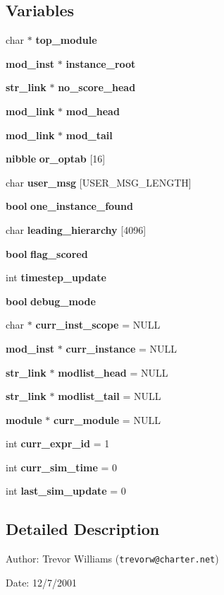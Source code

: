 \subsection*{Variables}
\begin{CompactItemize}
\item 
char $\ast$ {\bf top\_\-module}
\item 
{\bf mod\_\-inst} $\ast$ {\bf instance\_\-root}
\item 
{\bf str\_\-link} $\ast$ {\bf no\_\-score\_\-head}
\item 
{\bf mod\_\-link} $\ast$ {\bf mod\_\-head}
\item 
{\bf mod\_\-link} $\ast$ {\bf mod\_\-tail}
\item 
{\bf nibble} {\bf or\_\-optab} [16]
\item 
char {\bf user\_\-msg} [USER\_\-MSG\_\-LENGTH]
\item 
{\bf bool} {\bf one\_\-instance\_\-found}
\item 
char {\bf leading\_\-hierarchy} [4096]
\item 
{\bf bool} {\bf flag\_\-scored}
\item 
int {\bf timestep\_\-update}
\item 
{\bf bool} {\bf debug\_\-mode}
\item 
char $\ast$ {\bf curr\_\-inst\_\-scope} = NULL
\item 
{\bf mod\_\-inst} $\ast$ {\bf curr\_\-instance} = NULL
\item 
{\bf str\_\-link} $\ast$ {\bf modlist\_\-head} = NULL
\item 
{\bf str\_\-link} $\ast$ {\bf modlist\_\-tail} = NULL
\item 
{\bf module} $\ast$ {\bf curr\_\-module} = NULL
\item 
int {\bf curr\_\-expr\_\-id} = 1
\item 
int {\bf curr\_\-sim\_\-time} = 0
\item 
int {\bf last\_\-sim\_\-update} = 0
\end{CompactItemize}


\subsection{Detailed Description}
\begin{Desc}
\item[Author:]Trevor Williams ({\tt trevorw@charter.net}) \end{Desc}
\begin{Desc}
\item[Date:]12/7/2001\end{Desc}


